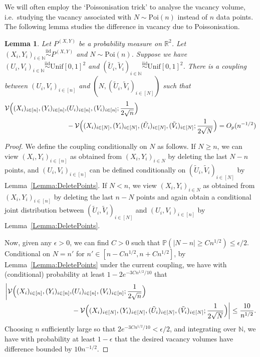 \documentclass[11pt]{article}
\newtheorem{lemma}[thm]{Lemma}
\newcommand{\iid}{\stackrel{\mathrm{iid}}\sim}
\begin{document}
We will often employ the `Poissonisation trick' to analyse the vacancy volume, i.e.\ studying the vacancy associated with $N\sim \mathrm{Poi}(n)$ instead of $n$ data points. The following lemma studies the difference in vacancy due to Poissonisation. 

\begin{lemma}
    \label{Lemma:Poissonisation}
    Let $P^{(X,Y)}$ be a probability measure on $\mathbb{R}^2$. Let $(X_i,Y_i)_{i\in\mathbb{N}} \iid P^{(X,Y)}$ and $N\sim \mathrm{Poi}(n)$.  Suppose we have $(U_i,V_i)_{i\in\mathbb{N}}\stackrel{\mathrm{iid}}\sim \mathrm{Unif}[0,1]^2$ and $(\tilde U_i, \tilde V_i)_{i\in\mathbb{N}}\stackrel{\mathrm{iid}}\sim \mathrm{Unif}[0,1]^2$.
    There is a coupling between $(U_i,V_i)_{i\in [n]}$ and $(N, (\tilde U_i, \tilde V_i)_{i\in[N]})$ such that 
    \begin{align*}
     \mathcal{V}\Bigl((X_i)_{i\in[n]}, (Y_i)_{i\in[n]}, &(U_i)_{i\in[n]}, (V_i)_{i\in[n]}; \frac{1}{2\sqrt{n}}\Bigr) \\
     & - \mathcal{V}\Bigl((X_i)_{i\in[N]}, (Y_i)_{i\in[N]}, (\tilde U_i)_{i\in[N]}, (\tilde V_i)_{i\in[N]}; \frac{1}{2\sqrt{N}}\Bigr) = O_p(n^{-1/2})
    \end{align*}
\end{lemma}
\begin{proof}
We define the coupling conditionally on $N$ as follows. If $N \geq n$, we can view $(X_i,Y_i)_{i\in[n]}$ as obtained from $(X_i,Y_i)_{i\in N}$ by deleting the last $N-n$ points, and $(U_i, V_i)_{i\in[n]}$ can be defined conditionally on $(\tilde U_i,\tilde V_i)_{i\in[N]}$ by Lemma~\ref{Lemma:DeletePoints}. If $N < n$, we view $(X_i,Y_i)_{i\in N}$ as obtained from $(X_i,Y_i)_{i\in[n]}$ by deleting the last $n-N$ points and again obtain a conditional joint distribution between $(\tilde U_i,\tilde V_i)_{i\in[N]}$ and $(U_i,V_i)_{i\in[n]}$ by Lemma~\ref{Lemma:DeletePoints}.

Now, given any $\epsilon > 0$, we can find $C>0$ such that $\mathbb{P}(|N-n|\geq Cn^{1/2}) \leq \epsilon/2$. Conditional on $N=n'$ for $n'\in [n-Cn^{1/2}, n+Cn^{1/2}]$, by Lemma~\ref{Lemma:DeletePoints} under the current coupling, we have with (conditional) probability at least $1-2e^{-3Cn^{1/2}/10}$ that 
\begin{align*}
    \biggl|\mathcal{V}\Bigl((X_i)_{i\in[n]}, (Y_i)_{i\in[n]}, &(U_i)_{i\in[n]}, (V_i)_{i\in[n]}; \frac{1}{2\sqrt{n}}\Bigr) \\
    & - \mathcal{V}\Bigl((X_i)_{i\in[N]}, (Y_i)_{i\in[N]}, (\tilde U_i)_{i\in[N]}, (\tilde V_i)_{i\in[N]}; \frac{1}{2\sqrt{N}}\Bigr)\biggr| \leq \frac{10}{n^{1/2}}.
\end{align*}
Choosing $n$ sufficiently large so that $2e^{-3Cn^{1/2}/10}<\epsilon/2$, and integrating over $\mathbb{N}$, we have with probability at least $1-\epsilon$ that the desired vacancy volumes have difference bounded by $10n^{-1/2}$.
\end{proof}
\end{document}
